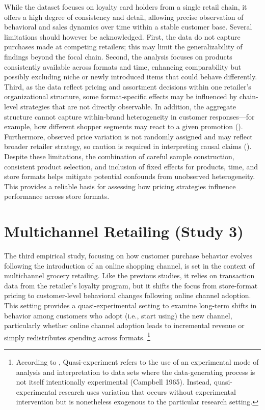 While the dataset focuses on loyalty card holders from a single retail chain, it offers a high degree of consistency and detail, allowing precise observation of behavioral and sales dynamics over time within a stable customer base. Several limitations should however be acknowledged. First, the data do not capture purchases made at competing retailers; this may limit the generalizability of findings beyond the focal chain. Second, the analysis focuses on products consistently available across formats and time, enhancing comparability but possibly excluding niche or newly introduced items that could behave differently. Third, as the data reflect pricing and assortment decisions within one retailer’s organizational structure, some format-specific effects may be influenced by chain-level strategies that are not directly observable. In addition, the aggregate structure cannot capture within-brand heterogeneity in customer responses—for example, how different shopper segments may react to a given promotion (\cite{Ailawadi2004-ig, Geyskens2010-bx}). Furthermore, observed price variation is not randomly assigned and may reflect broader retailer strategy, so caution is required in interpreting causal claims (\cite{Bijmolt2005-kg, Datta2022-fz}). Despite these limitations, the combination of careful sample construction, consistent product selection, and inclusion of fixed effects for products, time, and store formats helps mitigate potential confounds from unobserved heterogeneity. This provides a reliable basis for assessing how pricing strategies influence performance across store formats.

\section{Multichannel Retailing (Study 3)}
The third empirical study, focusing on how customer purchase behavior evolves following the introduction of an online shopping channel, is set in the context of multichannel grocery retailing. Like the previous studies, it relies on transaction data from the retailer’s loyalty program, but it shifts the focus from store-format pricing to customer-level behavioral changes following online channel adoption. This setting provides a quasi-experimental setting to examine long-term shifts in behavior among customers who adopt (i.e., start using) the new channel, particularly whether online channel adoption leads to incremental revenue or simply redistributes spending across formats. \footnote{According to \textcite{Goldfarb2022-jt},
Quasi-experiment refers to the use of an experimental mode of analysis and interpretation to data sets where the data-generating process is not itself intentionally experimental (Campbell 1965). Instead, quasi-experimental research uses variation that occurs without experimental intervention but is nonetheless exogenous to the particular research setting.
}

